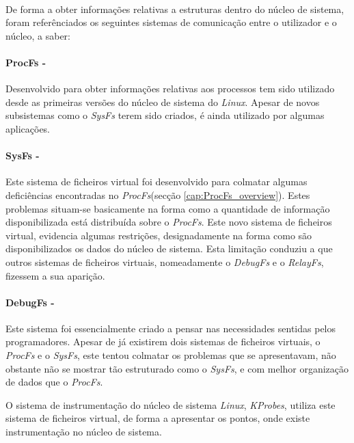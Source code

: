\paragraph*{}
De forma a obter informações relativas a estruturas dentro do núcleo de sistema, foram referênciados os seguintes sistemas de comunicação entre o utilizador e o núcleo, a saber:

\paragraph*{ProcFs - }\label{cap:ProcFs_overview}

Desenvolvido para obter informações relativas aos processos tem sido utilizado desde as primeiras versões do núcleo de sistema do \textit{Linux}.
Apesar de novos subsistemas como o \textit{SysFs} terem sido criados, é ainda utilizado por algumas aplicações.

\paragraph*{SysFs - }\label{cap:SysFs_overview}

Este sistema de ficheiros virtual foi desenvolvido para colmatar algumas deficiências encontradas no \textit{ProcFs}(secção \ref{cap:ProcFs_overview}).
Estes problemas situam-se basicamente na forma como a quantidade de informação disponibilizada está distribuída sobre o \textit{ProcFs}.
Este novo sistema de ficheiros virtual, evidencia algumas restrições, designadamente na forma como são disponibilizados os dados do núcleo de sistema.
Esta limitação conduziu a que outros sistemas de ficheiros virtuais, nomeadamente o \textit{DebugFs} e o \textit{RelayFs}, fizessem a sua aparição.

\paragraph*{DebugFs - }\label{cap:DebugFs_overview}

Este sistema foi essencialmente criado a pensar nas necessidades sentidas pelos programadores.
Apesar de já existirem dois sistemas de ficheiros virtuais, o \textit{ProcFs} e o \textit{SysFs}, este tentou colmatar os problemas que se apresentavam, não obstante não se mostrar tão estruturado como o \textit{SysFs}, e com melhor organização de dados que o \textit{ProcFs}.

O sistema de instrumentação do núcleo de sistema \textit{Linux}, \textit{KProbes}, utiliza este sistema de ficheiros virtual, de forma a apresentar os pontos, onde existe instrumentação no núcleo de sistema.

